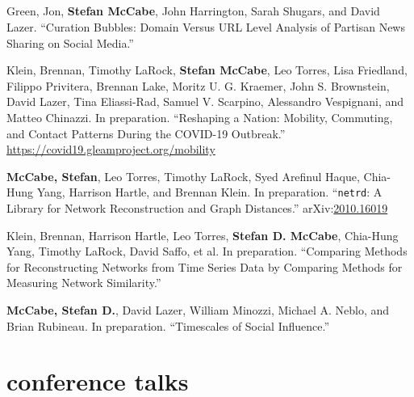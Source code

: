 \documentclass[11pt, letter]{article}
\begin{document}
\subsection*{} %
\vspace{-6mm} %
\begin{hangparas}{.25in}{1}
Green, Jon, \textbf{Stefan McCabe}, John Harrington, Sarah Shugars, and David Lazer.
``Curation Bubbles: Domain Versus URL Level Analysis of Partisan News Sharing
on Social Media.'' \vspace{2mm}

Klein, Brennan,\textsuperscript{\textdagger} Timothy
LaRock,\textsuperscript{\textdagger} \textbf{Stefan
  McCabe},\textsuperscript{\textdagger} Leo Torres,\textsuperscript{\textdagger}
Lisa Friedland, Filippo Privitera, Brennan Lake, Moritz U. G. Kraemer, John S.
Brownstein, David Lazer, Tina Eliassi-Rad, Samuel V. Scarpino, Alessandro
Vespignani, and Matteo Chinazzi. In preparation. ``Reshaping a Nation: Mobility,
Commuting, and Contact Patterns During the COVID-19 Outbreak.''
\href{https://covid19.gleamproject.org/mobility}{https://covid19.gleamproject.org/mobility} \vspace{2mm}

\textbf{McCabe, Stefan}, Leo Torres, Timothy LaRock, Syed Arefinul Haque,
Chia-Hung Yang, Harrison Hartle, and Brennan Klein. In preparation.
``\texttt{netrd}: A Library for Network Reconstruction and Graph Distances.''
arXiv:\href{https://arxiv.org/abs/2010.16019}{2010.16019} \vspace{2mm}

Klein, Brennan, Harrison Hartle, Leo Torres, \textbf{Stefan D. McCabe},
Chia-Hung Yang, Timothy LaRock, David Saffo, et al. In preparation. ``Comparing
Methods for Reconstructing Networks from Time Series Data by Comparing Methods
for Measuring Network Similarity.'' \vspace{2mm}

\textbf{McCabe, Stefan D.}, David Lazer, William Minozzi, Michael A. Neblo, and
Brian Rubineau. In preparation. ``Timescales of Social Influence.'' \vspace{2mm}
\end{hangparas}

\section{conference talks}
\end{document}
